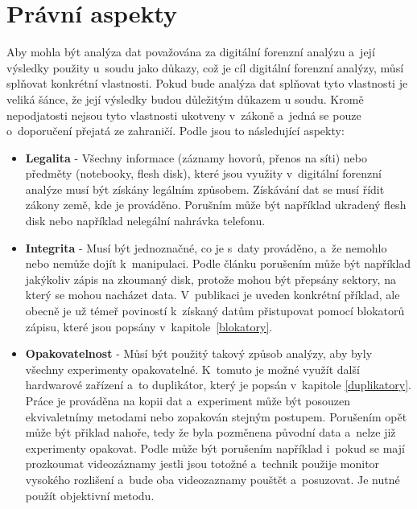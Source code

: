 \documentclass[thesis=B,czech]{FITthesis}[2012/06/26]
\begin{document}
\section{Právní aspekty}

Aby mohla být analýza dat považována za digitální forenzní analýzu a~její výsledky použity u~soudu jako důkazy, což je cíl digitální forenzní analýzy, můsí splňovat konkrétní vlastnosti. Pokud bude analýza dat splňovat tyto vlastnosti je veliká šánce, že její výsledky budou důležitým důkazem u soudu. Kromě nepodjatosti nejsou tyto vlastnosti ukotveny v~zákoně a~jedná se pouze o~doporučení přejatá ze zahraničí. Podle \cite{svetlik2010digitalni} jsou to následující aspekty:

\begin{itemize}

\item \textbf{Legalita} - Všechny informace (záznamy hovorů, přenos na síti) nebo předměty (notebooky, flesh disk), které jsou využity v~digitální forenzní analýze musí být získány legálním způsobem. Získávání dat se musí řídit zákony země, kde je prováděno. Porušním může být například ukradený flesh disk nebo například nelegální nahrávka telefonu. 

\item \textbf{Integrita} - Musí být jednoznačné, co je s~daty prováděno, a~že nemohlo nebo nemůže dojít k~manipulaci. Podle článku \cite{svetlik2010digitalni} porušením může být například jakýkoliv zápis na zkoumaný disk, protože mohou být přepsány sektory, na který se mohou nacházet data. V~publikaci je uveden konkrétní příklad, ale obecně je už témeř poviností k~získaný datům přistupovat pomocí blokatorů zápisu, které jsou popsány v~kapitole~\ref{blokatory}.

\item \textbf{Opakovatelnost} - Můsí být použitý takový způsob analýzy, aby byly všechny experimenty opakovatelné. K~tomuto je možné využít další hardwarové zařízení a~to duplikátor, který je popsán v~kapitole \ref{duplikatory}. Práce je prováděna na kopii dat a~experiment může být posouzen ekvivaletnímy metodami nebo zopakován stejným postupem. Porušením opět může být přiklad nahoře, tedy že byla pozměnena původní data a~nelze již experimenty opakovat. Podle \cite{svetlik2010digitalni} může být porušením například i~pokud se mají prozkoumat videozáznamy jestli jsou totožné a~technik použije monitor vysokého rozlišení a~bude oba videozaznamy pouštět a~posuzovat. Je nutné použít objektivní metodu.


\end{itemize}
\end{document}
